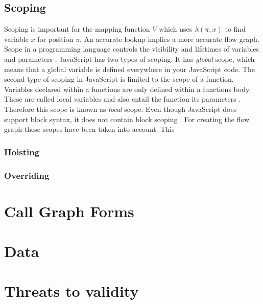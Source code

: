 \documentclass[journal,10pt]{IEEEtran}
\begin{document}
\subsection{Scoping}
Scoping is important for the mapping function $V$ which uses $\lambda(\pi, x)$ to find variable $x$ for position $\pi$. An accurate lookup implies a more accurate flow graph. %
Scope in a programming language controls the visibility and lifetimes of variables and parameters \cite[p.36]{Crockford:2008:JGP}. JavaScript has two types of scoping. It has \textit{global} scope, which means that a global variable is defined everywhere in your JavaScript code. The second type of scoping in
JavaScript is limited to the scope of a function. Variables declared within a functions are only defined within a functions body. These are called local variables and also entail the function its parameters \cite[p.53]{flanagan2011javascript}. Therefore this scope is known as \textit{local} scope. Even though JavaScript does support block syntax, it does not contain block scoping \cite[p.36]{Crockford:2008:JGP}.
For creating the flow graph these scopes have been taken into account. This 

\subsubsection{Hoisting}


\subsubsection{Overriding}


\section{Call Graph Forms}


\section{Data}

\section{Threats to validity}
\end{document}
